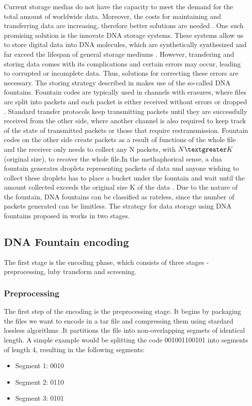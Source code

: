 \documentclass[12pt]%
{article}
\begin{document}
Current storage medias do not have the capacity to meet the demand for the total amount of worldwide data. Moreover, the costs for maintaining and transferring data are increasing, therefore better solutions are needed \cite{dong2020dna}. One such promising solution is the innovate DNA storage systems. These systems allow us to store digital data into DNA molecules, which are synthetically synthesized and far exceed the lifespan of general storage mediums \cite{dong2020dna}. However, transfering and storing data comes with its complications and certain errors may occur, leading to corrupted or incomplete data. Thus, solutions for correcting these errors are necessary. The storing strategy described in \cite{erlich2017dna} makes use of the so-called DNA fountains. Fountain codes are typically used in channels with erasures, where files are split into packets and each packet is either received without errors or dropped \cite{mackay2005fountain}.  Standard transfer protocols keep transmitting packets until they are successfully received from the other side, where another channel is also required to keep track of the state of transmitted packets or those that require restransmission. Fountain codes on the other side create packets as a result of functions of the whole file and the receiver only needs to collect any N packets, with $N \textgreater K$ (original size), to recover the whole file.In the methaphorical sense, a dna fountain generates droplets representing packets of data und anyone wishing to collect these droplets has to place a bucket under the fountain and wait until the amount collected exceeds the original size K of the data \cite{mackay2005fountain}. Due to the nature of the fountain,  DNA fountains can be classified as rateless, since the number of packets generated can be limitless.
The strategy for data storage using DNA fountains proposed in \cite{erlich2017dna} works in two stages. 

\subsection{DNA Fountain encoding}

The first stage is the encoding phase, which consists of three stages - preprocessing, luby transform and screening.

\subsubsection{Preprocessing}  
The first step of the encoding is the preprocessing stage. It begins by packaging the files we want to encode in a tar file and compressing them using stardard lossless algorithms \cite{erlich2017dnasupplementary}.It partitions the file into non-overlapping segmets of identical length. A simple example would be splitting the code 001001100101 into segments of length 4, resulting in the following segments:
\begin{itemize}
\item Segment 1: 0010
\item Segment 2: 0110
\item Segment 3: 0101
\end{itemize}
\end{document}
